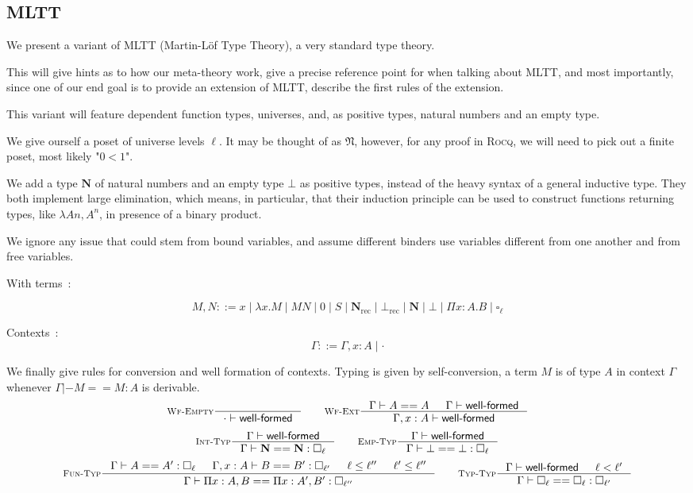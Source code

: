 \documentclass[11pt]{article}
\DeclareMathOperator{\rec}{rec}
\newcommand{\0}{\mathbf{0}}
\newcommand{\1}{\mathbf{1}}
\newcommand{\nat}{\mathbf{N}}
\newcommand{\mnat}{\mathfrak{N}}
\newcommand{\tctx}{\Gamma}
\newcommand{\Wf}{\textsf{well-formed}}
\newcommand{\rocq}{\textsc{Rocq}}
\begin{document}
\subsection{MLTT}
We present a variant of MLTT (Martin-Löf Type Theory), a very standard type theory.

This will give hints as to how our meta-theory work, give a precise reference point for when talking about MLTT, and most importantly, since one of our end goal is to provide an extension of MLTT, describe the first rules of the extension.

This variant will feature dependent function types, universes, and, as positive types, natural numbers and an empty type.

We give ourself a poset of universe levels $\ell$. It may be thought of as $\mnat$, however, for any proof in \rocq, we will need to pick out a finite poset, most likely "$0 < 1$".

We add a type $\nat$ of natural numbers and an empty type $\bot$ as positive types, instead of the heavy syntax of a general inductive type.
They both implement large elimination, which means, in particular, that their induction principle can be used to construct functions returning types, like $\lambda A n, A^n$, in presence of a binary product.

We ignore any issue that could stem from bound variables, and assume different binders use variables different from one another and from free variables.

With terms~:

$$ M,N ::= x \mid \lambda x. M \mid MN \mid 0 \mid S \mid \nat_{\rec} \mid \bot_{\rec} \mid \nat \mid \bot \mid \Pi x :A.B \mid \square_\ell $$


Contexts~:
$$ \tctx ::= \tctx, x : A \mid \cdot $$

We finally give rules for conversion and well formation of contexts. Typing is given by self-conversion, a term $M$ is of type $A$ in context $\Gamma$ whenever $\Gamma |- M == M : A$ is derivable.
$$
    \inference[\textsc{Wf-Empty}]{}{\cdot |- \Wf} \qquad
    \inference[\textsc{Wf-Ext}]{\tctx |- A == A & \tctx |- \Wf}{ \tctx, x : A |- \Wf}
$$
$$
    \inference[\textsc{Int-Typ}]{\tctx |- \Wf}{\tctx |- \nat == \nat : \square_\ell} \qquad
    \inference[\textsc{Emp-Typ}]{\tctx |- \Wf}{\tctx |- \bot == \bot : \square_\ell}
$$
$$
    \inference[\textsc{Fun-Typ}]{\tctx |- A == A' : \square_\ell & \tctx, x : A |- B == B' : \square_{\ell'} & \ell \leq \ell'' & \ell' \leq \ell''}{\tctx |- \Pi x  : A, B == \Pi x: A', B' : \square_{\ell''}} \qquad
    \inference[\textsc{Typ-Typ}]{\tctx |- \Wf & \ell < \ell' }{\tctx |- \square_\ell == \square_\ell: \square_{\ell'}}
$$
\end{document}
